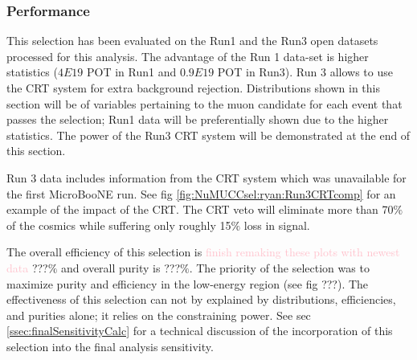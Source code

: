 \subsubsection{Performance}
\label{sssec:NuMUCCsel:constr:performance}

\par This selection has been evaluated on the Run1 and the Run3 open datasets processed for this analysis. The advantage of the Run 1 data-set is higher statistics ($4E19$ POT in Run1 and $0.9E19$ POT in Run3). Run 3 allows to use the CRT system for extra background rejection. Distributions shown in this section will be of variables pertaining to the muon candidate for each event that passes the selection; Run1 data will be preferentially shown due to the higher statistics. The power of the Run3 CRT system will be demonstrated at the end of this section.

\par Run 3 data includes information from the CRT system which was unavailable for the first MicroBooNE run. See fig \ref{fig:NuMUCCsel:ryan:Run3CRTcomp} for an example of the impact of the CRT. The CRT veto will eliminate more than 70$\%$ of the cosmics while suffering only roughly 15$\%$ loss in signal.

\par The overall efficiency of this selection is \textcolor{pink}{finish remaking these plots with newest data} ???$\%$ and overall purity is ???$\%$. The priority of the selection was to maximize purity and efficiency in the low-energy region (see fig ???). The effectiveness of this selection can not by explained by distributions, efficiencies, and purities alone; it relies on the constraining power. See sec \ref{ssec:finalSensitivityCalc} for a technical discussion of the incorporation of this selection into the final analysis sensitivity.

